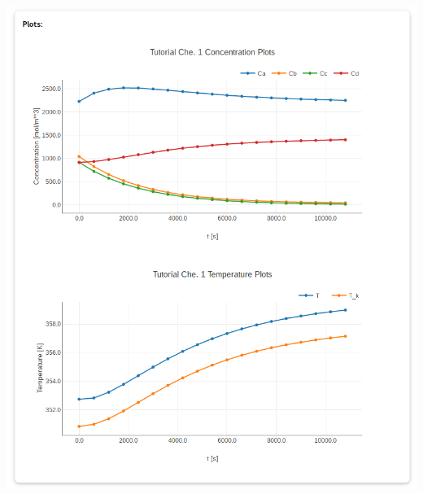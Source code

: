 \documentclass[compress,newPxFont,sthlmFooter]{beamer}
\begin{document}
\begin{frame}[plain]
\begin{columns}[t]
      \begin{column}{0.45\paperwidth}
        \begin{center}
            \includegraphics[align=c, width=\textwidth]{daetools_ws_html_plots.png}
        \end{center}
      \end{column}
    \end{columns}
\end{frame}
\end{document}
